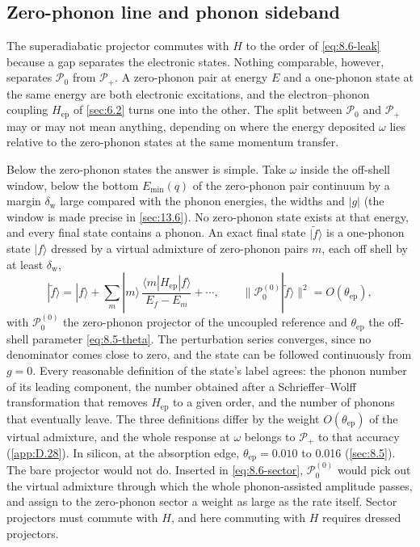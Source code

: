 \subsection{Zero-phonon line and phonon sideband}

The superadiabatic projector commutes with $H$ to the order of \cref{eq:8.6-leak} because a gap separates the electronic states. Nothing comparable, however, separates $\mathcal{P}_0$ from $\mathcal{P}_+$. A zero-phonon pair at energy $E$ and a one-phonon state at the same energy are both electronic excitations, and the electron--phonon coupling $H_{\mathrm{ep}}$ of \cref{sec:6.2} turns one into the other. The split between $\mathcal{P}_0$ and $\mathcal{P}_+$ may or may not mean anything, depending on where the energy deposited $\omega$ lies relative to the zero-phonon states at the same momentum transfer.

Below the zero-phonon states the answer is simple. Take $\omega$ inside the off-shell window, below the bottom $E_{\mathrm{min}}(q)$ of the zero-phonon pair continuum by a margin $\delta_{\mathrm{w}}$ large compared with the phonon energies, the widths and $|g|$ (the window is made precise in \cref{sec:13.6}). No zero-phonon state exists at that energy, and every final state contains a phonon. An exact final state $|\tilde f\rangle$ is a one-phonon state $|f\rangle$ dressed by a virtual admixture of zero-phonon pairs $m$, each off shell by at least $\delta_{\mathrm{w}}$,
\begin{equation*}
  |\tilde f\rangle = |f\rangle + \sum_m|m\rangle\,\frac{\langle m|H_{\mathrm{ep}}|f\rangle}{E_f - E_m} + \cdots , \qquad
  \bigl\|\mathcal{P}_0^{(0)}|\tilde f\rangle\bigr\|^2 = O(\theta_{\mathrm{ep}}) ,
\end{equation*}
with $\mathcal{P}_0^{(0)}$ the zero-phonon projector of the uncoupled reference and $\theta_{\mathrm{ep}}$ the off-shell parameter \cref{eq:8.5-theta}. The perturbation series converges, since no denominator comes close to zero, and the state can be followed continuously from $g = 0$. Every reasonable definition of the state's label agrees: the phonon number of its leading component, the number obtained after a Schrieffer--Wolff transformation that removes $H_{\mathrm{ep}}$ to a given order, and the number of phonons that eventually leave. The three definitions differ by the weight $O(\theta_{\mathrm{ep}})$ of the virtual admixture, and the whole response at $\omega$ belongs to $\mathcal{P}_+$ to that accuracy (\cref{app:D.28}). In silicon, at the absorption edge, $\theta_{\mathrm{ep}} = 0.010$ to 0.016 (\cref{sec:8.5}). The bare projector would not do. Inserted in \cref{eq:8.6-sector}, $\mathcal{P}_0^{(0)}$ would pick out the virtual admixture through which the whole phonon-assisted amplitude passes, and assign to the zero-phonon sector a weight as large as the rate itself. Sector projectors must commute with $H$, and here commuting with $H$ requires dressed projectors.

